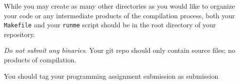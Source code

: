 \documentclass{article}
\begin{document}
While you may create as many other directories as you would like to organize your code or any intermediate products of the compilation process, both your \texttt{Makefile} and your \texttt{runme} script should be in the root directory of your repository.

{\em Do not submit any binaries}. Your git repo should only contain source files; no products of compilation.

You should tag your programming assignment submission as \textsf{submission}
\end{document}
